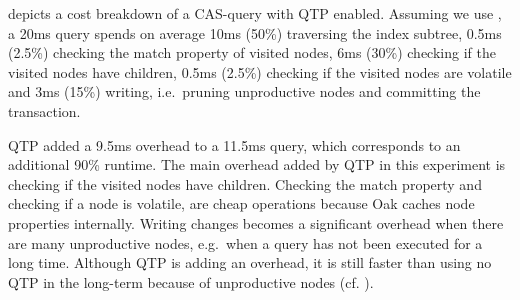 \documentclass[abstracton,12pt]{scrartcl}
\theoremstyle{definition}
\begin{document}


 depicts a cost breakdown of a CAS-query with QTP enabled.
Assuming we use , a 20ms query spends on 
average 10ms (50\%) traversing the index subtree, 0.5ms (2.5\%) checking
the match property of visited nodes, 6ms (30\%) checking if the visited nodes
have children, 0.5ms (2.5\%) checking if the visited nodes are volatile and 3ms
(15\%) writing, i.e.\ pruning unproductive nodes and committing the transaction.

QTP added a 9.5ms overhead to a 11.5ms query, which corresponds to an additional 90\%
runtime. The main overhead added by QTP in this experiment is checking if the visited 
nodes have children. Checking the match property and checking if a node is volatile, 
are cheap operations because Oak caches node properties internally.
Writing changes becomes a significant overhead when there are many
unproductive nodes, e.g.\ when a query has not been executed for a long time.
Although QTP is adding an overhead, it is still faster than using no QTP
in the long-term because of unproductive nodes (cf. ).

\end{document}
